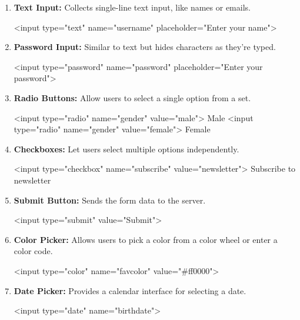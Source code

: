 \documentclass{report}
\begin{document}
\begin{itemize}
\begin{enumerate}
            \item \textbf{Text Input:} Collects single-line text input, like names or emails.
                \bigbreak \noindent 
                \begin{htmlcode}
                    <input type="text" name="username" placeholder="Enter your name">
                \end{htmlcode}
            \item \textbf{Password Input:} Similar to text but hides characters as they're typed.
                \bigbreak \noindent 
                \begin{htmlcode}
                 <input type="password" name="password" placeholder="Enter your password">
                \end{htmlcode}
            \item \textbf{Radio Buttons:} Allow users to select a single option from a set.
                \bigbreak \noindent 
                \begin{htmlcode}
                    <input type="radio" name="gender" value="male"> Male
                    <input type="radio" name="gender" value="female"> Female
                \end{htmlcode}
            \item \textbf{Checkboxes:} Let users select multiple options independently.
                \bigbreak \noindent 
                \begin{htmlcode}
                 <input type="checkbox" name="subscribe" value="newsletter"> Subscribe to newsletter
                \end{htmlcode}
            \item \textbf{Submit Button:} Sends the form data to the server.
                \bigbreak \noindent 
                \begin{htmlcode}
                    <input type="submit" value="Submit">
                \end{htmlcode}
            \item \textbf{Color Picker:} Allows users to pick a color from a color wheel or enter a color code.
                \bigbreak \noindent 
                \begin{htmlcode}
                    <input type="color" name="favcolor" value="#ff0000">
                \end{htmlcode}
                
            \item \textbf{Date Picker:} Provides a calendar interface for selecting a date.
                \bigbreak \noindent 
                \begin{htmlcode}
                    <input type="date" name="birthdate">
                \end{htmlcode}


\end{enumerate}
\end{itemize}
\end{document}
